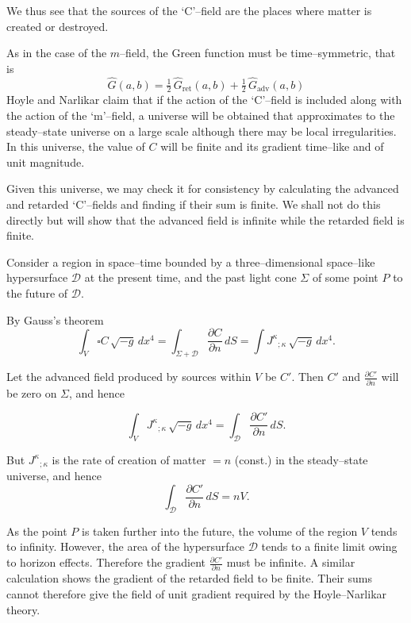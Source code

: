 \medskip

We thus see that the sources of the `C'--field are the places 
where matter is created or destroyed.  

As in the case of the \(m\)--field, the Green function must be 
time--symmetric, that is
\[
\hat{G}(a,b) = \tfrac{1}{2}\, \hat{G}_{\text{ret}}(a,b) 
+ \tfrac{1}{2}\, \hat{G}_{\text{adv}}(a,b)
\]
Hoyle and Narlikar claim that if the action of the 
`C'--field is included along with the action of the `m'--field, 
a universe will be obtained that approximates to the steady--state 
universe on a large scale although there may be local irregularities. 
In this universe, the value of \(C\) will be finite and its gradient 
time--like and of unit magnitude.

\medskip

Given this universe, we may check it for consistency by calculating 
the advanced and retarded `C'--fields and finding if their sum is finite. 
We shall not do this directly but will show that the advanced field 
is infinite while the retarded field is finite.

\medskip

Consider a region in space--time bounded by a three--dimensional 
space--like hypersurface \(\mathcal{D}\) at the present time, 
and the past light cone \(\Sigma\) of some point \(P\) to the future of \(\mathcal{D}\).

By Gauss's theorem
\[
\int_{V} \square C \, \sqrt{-g}\, dx^{4} 
= \int_{\Sigma + \mathcal{D}} \frac{\partial C}{\partial n}\, dS
= \int J^{\kappa}{}_{;\kappa}\, \sqrt{-g}\, dx^{4}.
\]

Let the advanced field produced by sources within \(V\) be \(C'\).  
Then \(C'\) and \(\frac{\partial C'}{\partial n}\) will be zero on \(\Sigma\), and hence


\[
\int_{V} J^{\kappa}{}_{;\kappa} \, \sqrt{-g}\, dx^{4} 
= \int_{\mathcal{D}} \frac{\partial C'}{\partial n}\, dS.
\]

But \(J^{\kappa}{}_{;\kappa}\) is the rate of creation of matter \(= n\) (const.) 
in the steady--state universe, and hence
\[
\int_{\mathcal{D}} \frac{\partial C'}{\partial n}\, dS = nV.
\]

As the point \(P\) is taken further into the future, the volume 
of the region \(V\) tends to infinity. However, the area of the 
hypersurface \(\mathcal{D}\) tends to a finite limit owing to horizon 
effects. Therefore the gradient \(\tfrac{\partial C'}{\partial n}\) must be infinite.  
A similar calculation shows the gradient of the retarded 
field to be finite. Their sums cannot therefore give the 
field of unit gradient required by the Hoyle--Narlikar theory.

